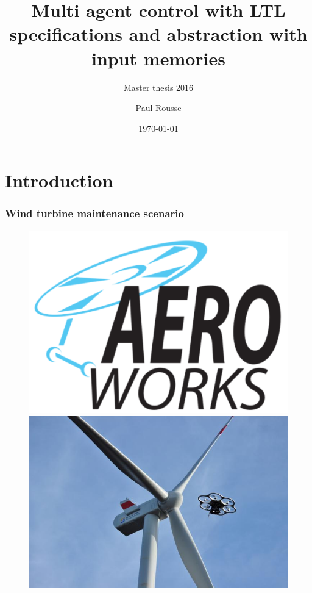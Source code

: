 \documentclass{beamer}
\title{Multi agent control with LTL specifications and abstraction with input memories}
\subtitle{Master thesis 2016}
\author{Paul Rousse}
\institute{Automatic Departement}
\date{\today}
\begin{document}
\begin{frame}
\titlepage
\end{frame}

\section{Introduction}

\begin{frame}
\frametitle{Wind turbine maintenance scenario}

\begin{figure}
\begin{minipage}{0.32\textwidth}
\centering
\includegraphics[width=\textwidth]{aerowork}
\end{minipage}
\hspace*{\fill}%
\begin{minipage}{0.35\textwidth}
\centering
\includegraphics[width=\textwidth]{inspectionquad}
\end{minipage}
\end{figure}


\end{frame}
\end{document}
